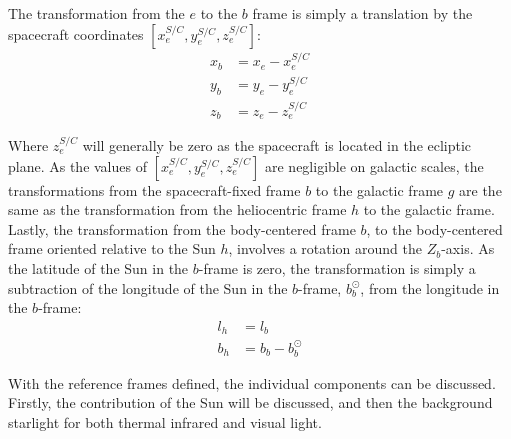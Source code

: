 The transformation from the $e$ to the $b$ frame is simply a translation by the spacecraft coordinates $[x_e^{S/C}, y_e^{S/C}, z_e^{S/C}]$:
\begin{align}
 x_b &= x_e - x_e^{S/C} \\
 y_b &= y_e - y_e^{S/C} \\
 z_b &= z_e - z_e^{S/C}
\end{align}

Where $z_e^{S/C}$ will generally be zero as the spacecraft is located in the ecliptic plane. As the values of $[x_e^{S/C}, y_e^{S/C}, z_e^{S/C}]$ are negligible on galactic scales, the transformations from the spacecraft-fixed frame $b$ to the galactic frame $g$ are the same as the transformation from the heliocentric frame $h$ to the galactic frame. Lastly, the transformation from the body-centered frame $b$, to the body-centered frame oriented relative to the Sun $h$, involves a rotation around the $Z_b$-axis. As the latitude of the Sun in the $b$-frame is zero, the transformation is simply a subtraction of the longitude of the Sun in the $b$-frame, $b_b^{\odot}$, from the longitude in the $b$-frame:
\begin{align}
 l_h &= l_b \\
 b_h &= b_b - b_b^{\odot}
\end{align}

With the reference frames defined, the individual components can be discussed. Firstly, the contribution of the Sun will be discussed, and then the background starlight for both thermal infrared and visual light.

